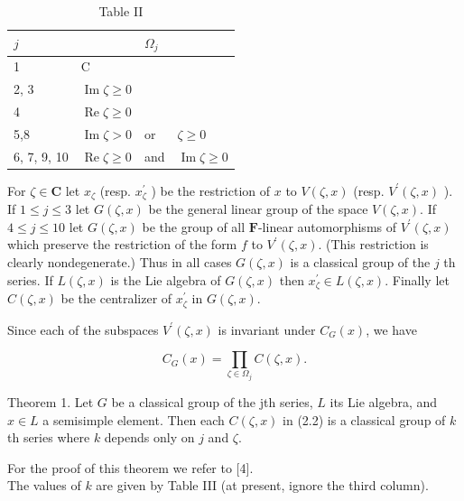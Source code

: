 \documentclass[10pt]{article}
\begin{document}
\begin{table}[h]
\begin{center}
\begin{tabular}[t]{|l|l|l|l|}
\hline
$j$ &  & $\Omega_{j}$ &  \\
\hline
1 & C &  &  \\
\hline
2, 3 & $\operatorname{Im} \zeta \geqslant 0$ &  &  \\
\hline
4 & $\operatorname{Re} \zeta \geqslant 0$ &  &  \\
\hline
5,8 & $\operatorname{Im} \zeta>0$ & or & $\zeta \geqslant 0$ \\
\hline
6, 7, 9, 10 & $\operatorname{Re} \zeta \geqslant 0$ & and & $\operatorname{Im} \zeta \geqslant 0$ \\
\hline
\end{tabular}
\captionsetup{labelformat=empty}
\caption{Table II}
\end{center}
\end{table}

For $\zeta \in \mathbf{C}$ let $x_{\zeta}$ (resp. $x_{\zeta}^{\prime}$ ) be the restriction of $x$ to $V(\zeta, x)$ (resp. $V^{\prime}(\zeta, x)$ ). If $1 \leqslant j \leqslant 3$ let $G(\zeta, x)$ be the general linear group of the space $V(\zeta, x)$. If $4 \leqslant j \leqslant 10$ let $G(\zeta, x)$ be the group of all $\mathbf{F}$-linear automorphisms of $V^{\prime}(\zeta, x)$ which preserve the restriction of the form $f$ to $V^{\prime}(\zeta, x)$. (This restriction is clearly nondegenerate.) Thus in all cases $G(\zeta, x)$ is a classical group of the $j$ th series. If $L(\zeta, x)$ is the Lie algebra of $G(\zeta, x)$ then $x_{\zeta}^{\prime} \in L(\zeta, x)$. Finally let $C(\zeta, x)$ be the centralizer of $x_{\zeta}^{\prime}$ in $G(\zeta, x)$.

Since each of the subspaces $V^{\prime}(\zeta, x)$ is invariant under $C_{G}(x)$, we have


\begin{equation*}
C_{G}(x)=\prod_{\zeta \in \Omega_{j}} C(\zeta, x) . \tag{2.2}
\end{equation*}


Theorem 1. Let $G$ be a classical group of the jth series, $L$ its Lie algebra, and $x \in L$ a semisimple element. Then each $C(\zeta, x)$ in (2.2) is a classical group of $k$ th series where $k$ depends only on $j$ and $\zeta$.

For the proof of this theorem we refer to [4].\\
The values of $k$ are given by Table III (at present, ignore the third column).
\end{document}
